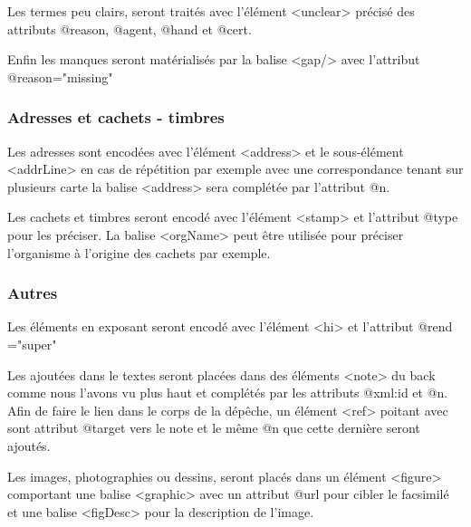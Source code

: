 \documentclass[12pt,a4paper,oneside]{book} %
\begin{document}
Les termes peu clairs, seront traités avec l'élément <unclear> précisé des attributs @reason, @agent, @hand et @cert.
\bigskip 

Enfin les manques seront matérialisés par la balise <gap/> avec l'attribut @reason="missing" 

\subsubsection*{Adresses et cachets - timbres}

Les adresses sont encodées avec l'élément <address> et le sous-élément <addrLine> en cas de répétition par exemple avec une correspondance tenant sur plusieurs carte la balise <address> sera complétée par l'attribut @n.

Les cachets et timbres seront encodé avec l'élément <stamp> et l'attribut @type pour les préciser. La balise <orgName> peut être utilisée pour préciser l'organisme à l'origine des cachets par exemple.

\subsubsection*{Autres}

Les éléments en exposant seront encodé avec l'élément <hi> et l'attribut @rend ="super"
\bigskip 

Les ajoutées dans le textes seront placées dans des éléments <note> du back comme nous l'avons vu plus haut et complétés par les attributs @xml:id et @n.
Afin de faire le lien dans le corps de la dépêche, un élément <ref> poitant avec sont attribut @target vers le note et le même @n que cette dernière seront ajoutés. 
\bigskip 

Les images, photographies ou dessins, seront placés dans un élément <figure> comportant une balise <graphic> avec un attribut @url pour cibler le facsimilé et une balise <figDesc> pour la description de l'image.
\end{document}
